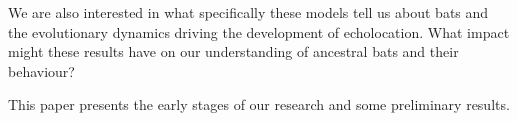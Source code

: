 \documentclass[wsdraft]{ws-rv9x6} %
\begin{document}
We are also interested in what specifically these models tell us about bats and the evolutionary dynamics driving the development of echolocation. What impact might these results have on our understanding of ancestral bats and their behaviour?

This paper presents the early stages of our research and some preliminary results.




\end{document}

